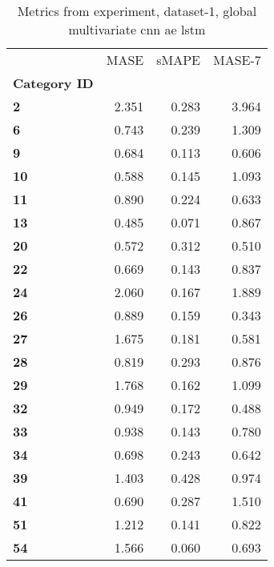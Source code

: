 \begin{table}[h]
\centering
\caption{Metrics from experiment, dataset-1, global multivariate cnn ae lstm}
\label{table:global-multivariate-cnn-ae-lstm-dataset-1}
\begin{tabular}{lrrr}
\toprule
{} &   MASE &  sMAPE &  MASE-7 \\
\textbf{Category ID} &        &        &         \\
\midrule
\textbf{2          } &  2.351 &  0.283 &   3.964 \\
\textbf{6          } &  0.743 &  0.239 &   1.309 \\
\textbf{9          } &  0.684 &  0.113 &   0.606 \\
\textbf{10         } &  0.588 &  0.145 &   1.093 \\
\textbf{11         } &  0.890 &  0.224 &   0.633 \\
\textbf{13         } &  0.485 &  0.071 &   0.867 \\
\textbf{20         } &  0.572 &  0.312 &   0.510 \\
\textbf{22         } &  0.669 &  0.143 &   0.837 \\
\textbf{24         } &  2.060 &  0.167 &   1.889 \\
\textbf{26         } &  0.889 &  0.159 &   0.343 \\
\textbf{27         } &  1.675 &  0.181 &   0.581 \\
\textbf{28         } &  0.819 &  0.293 &   0.876 \\
\textbf{29         } &  1.768 &  0.162 &   1.099 \\
\textbf{32         } &  0.949 &  0.172 &   0.488 \\
\textbf{33         } &  0.938 &  0.143 &   0.780 \\
\textbf{34         } &  0.698 &  0.243 &   0.642 \\
\textbf{39         } &  1.403 &  0.428 &   0.974 \\
\textbf{41         } &  0.690 &  0.287 &   1.510 \\
\textbf{51         } &  1.212 &  0.141 &   0.822 \\
\textbf{54         } &  1.566 &  0.060 &   0.693 \\
\bottomrule
\end{tabular}
\end{table}
